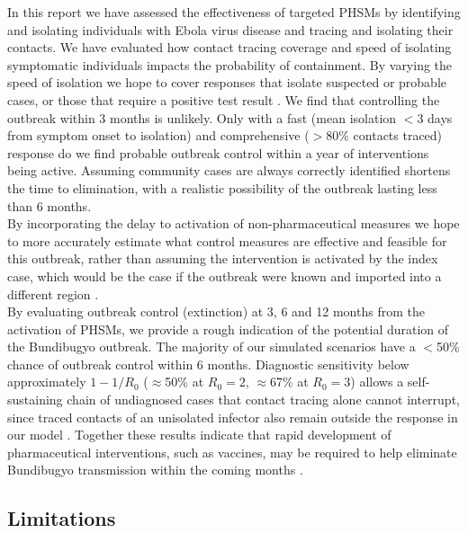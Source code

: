 \documentclass[12pt, letterpaper]{article}
\begin{document}
In this report we have assessed the effectiveness of targeted PHSMs by identifying and isolating individuals with Ebola virus disease and tracing and isolating their contacts. We have evaluated how contact tracing coverage and speed of isolating symptomatic individuals impacts the probability of containment. By varying the speed of isolation we hope to cover responses that isolate suspected or probable cases, or those that require a positive test result \citep{who2015contacttracing}. We find that controlling the outbreak within 3 months is unlikely. Only with a fast (mean isolation $<$3 days from symptom onset to isolation) and comprehensive ($>$80\% contacts traced) response do we find probable outbreak control within a year of interventions being active. Assuming community cases are always correctly identified shortens the time to elimination, with a realistic possibility of the outbreak lasting less than 6 months. \\

By incorporating the delay to activation of non-pharmaceutical measures we hope to more accurately estimate what control measures are effective and feasible for this outbreak, rather than assuming the intervention is activated by the index case, which would be the case if the outbreak were known and imported into a different region \citep{hellewell2020feasibility}. \\

By evaluating outbreak control (extinction) at 3, 6 and 12 months from the activation of PHSMs, we provide a rough indication of the potential duration of the Bundibugyo outbreak. The majority of our simulated scenarios have a $<$50\% chance of outbreak control within 6 months. Diagnostic sensitivity below approximately $1 - 1/R_0$ ($\approx$50\% at $R_0 = 2$, $\approx$67\% at $R_0 = 3$) allows a self-sustaining chain of undiagnosed cases that contact tracing alone cannot interrupt, since traced contacts of an unisolated infector also remain outside the response in our model \citep{dhillon2018contacttracing}. Together these results indicate that rapid development of pharmaceutical interventions, such as vaccines, may be required to help eliminate Bundibugyo transmission within the coming months \citep{oxford2026vaccinestatement}. \\

\subsection*{Limitations}
\end{document}
